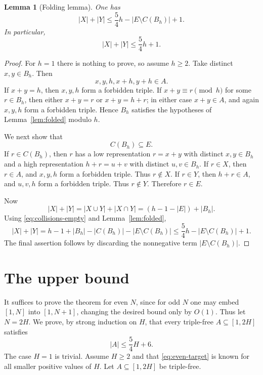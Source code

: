 \documentclass[11pt]{amsart}
\newtheorem{lemma}[theorem]{Lemma}
\theoremstyle{definition}
\begin{document}
\begin{lemma}[Folding lemma]\label{lem:folding}
One has
\[
  |X|+|Y|\leq \frac54h-|E\setminus C(B_h)|+1.
\]
In particular,
\[
  |X|+|Y|\leq \frac54h+1.
\]
\end{lemma}

\begin{proof}
For $h=1$ there is nothing to prove, so assume $h\geq 2$. Take distinct $x,y\in B_h$. Then
\[
  x,y,h,x+h,y+h\in A.
\]
If $x+y=h$, then $x,y,h$ form a forbidden triple. If $x+y\equiv r\pmod h$ for some $r\in B_h$, then either $x+y=r$ or $x+y=h+r$; in either case $x+y\in A$, and again $x,y,h$ form a forbidden triple. Hence $B_h$ satisfies the hypotheses of Lemma~\ref{lem:folded} modulo $h$.

We next show that
\begin{equation}\label{eq:collisions-empty}
  C(B_h)\subseteq E.
\end{equation}
If $r\in C(B_h)$, then $r$ has a low representation $r=x+y$ with distinct $x,y\in B_h$ and a high representation $h+r=u+v$ with distinct $u,v\in B_h$. If $r\in X$, then $r\in A$, and $x,y,h$ form a forbidden triple. Thus $r\notin X$. If $r\in Y$, then $h+r\in A$, and $u,v,h$ form a forbidden triple. Thus $r\notin Y$. Therefore $r\in E$.

Now
\[
  |X|+|Y|=|X\cup Y|+|X\cap Y|=(h-1-|E|)+|B_h|.
\]
Using \eqref{eq:collisions-empty} and Lemma~\ref{lem:folded},
\[
  |X|+|Y|=h-1+|B_h|-|C(B_h)|-|E\setminus C(B_h)|
  \leq \frac54h-|E\setminus C(B_h)|+1.
\]
The final assertion follows by discarding the nonnegative term $|E\setminus C(B_h)|$.
\end{proof}



\section{The upper bound}\label{sec:upper-bound}

It suffices to prove the theorem for even $N$, since for odd $N$ one may embed $[1,N]$ into $[1,N+1]$, changing the desired bound only by $O(1)$. Thus let $N=2H$. We prove, by strong induction on $H$, that every triple-free $A\subseteq[1,2H]$ satisfies
\begin{equation}\label{eq:even-target}
  |A|\leq \frac54H+6.
\end{equation}
The case $H=1$ is trivial. Assume $H\geq 2$ and that \eqref{eq:even-target} is known for all smaller positive values of $H$. Let $A\subseteq[1,2H]$ be triple-free.
\end{document}
